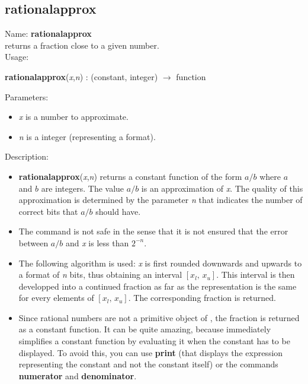 \subsection{rationalapprox}
\label{labrationalapprox}
\noindent Name: \textbf{rationalapprox}\\
returns a fraction close to a given number.\\

\noindent Usage: 
\begin{center}
\textbf{rationalapprox}(\emph{x},\emph{n}) : (\textsf{constant}, \textsf{integer}) $\rightarrow$ \textsf{function}\\
\end{center}
Parameters: 
\begin{itemize}
\item \emph{x} is a number to approximate.
\item \emph{n} is a integer (representing a format).
\end{itemize}
\noindent Description: \begin{itemize}

\item \textbf{rationalapprox}(\emph{x},\emph{n}) returns a constant function of the form $a/b$ where $a$ and $b$ are
   integers. The value $a/b$ is an approximation of \emph{x}. The quality of this 
   approximation is determined by the parameter \emph{n} that indicates the number of
   correct bits that $a/b$ should have.

\item The command is not safe in the sense that it is not ensured that the error 
   between $a/b$ and \emph{x} is less than $2^{-n}$.

\item The following algorithm is used: \emph{x} is first rounded downwards and upwards to
   a format of \emph{n} bits, thus obtaining an interval $[x_l,\,x_u]$. This interval is then
   developped into a continued fraction as far as the representation is the same
   for every elements of $[x_l,\,x_u]$. The corresponding fraction is returned.

\item Since rational numbers are not a primitive object of \sollya, the fraction is
   returned as a constant function. It can be quite amazing, because \sollya
   immediately simplifies a constant function by evaluating it when the constant
   has to be displayed.
   To avoid this, you can use \textbf{print} (that displays the expression representing
   the constant and not the constant itself) or the commands \textbf{numerator} 
   and \textbf{denominator}.
\end{itemize}
